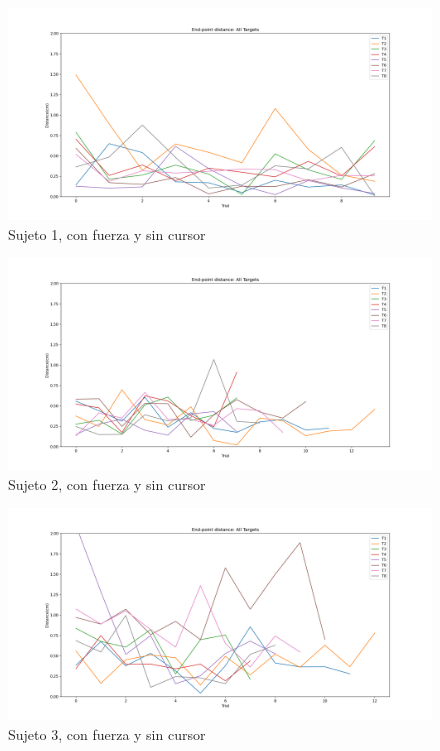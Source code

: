 \documentclass[a4paper,11pt, oneside]{book}
\begin{document}
\begin{figure}[H]
	\includegraphics[width=\linewidth]{sujeto1/force_no_cursor/evolution_distance}
	\caption{Sujeto 1, con  fuerza y sin cursor}
	\label{1-4-2}
\end{figure}
\begin{figure}[H]
	\includegraphics[width=\linewidth]{sujeto2/force_no_cursor/evolution_distance}
	\caption{Sujeto 2, con  fuerza y sin cursor}
	\label{2-4-2}
\end{figure}
\begin{figure}[H]
	\includegraphics[width=\linewidth]{sujeto3/force_no_cursor/evolution_distance}
	\caption{Sujeto 3, con  fuerza y sin cursor}
	\label{3-4-2}
\end{figure}
\end{document}
